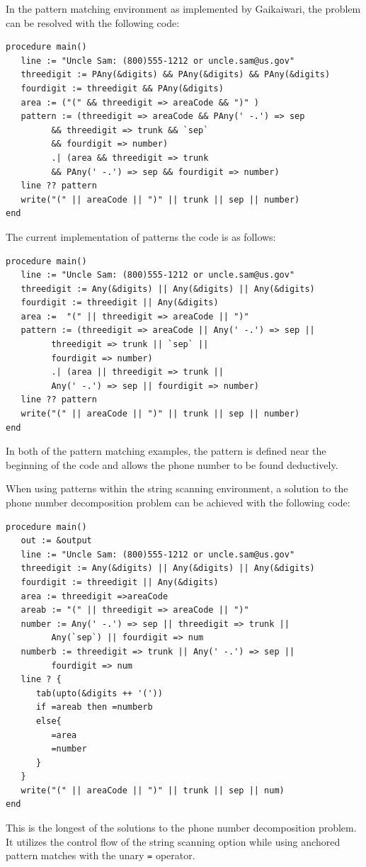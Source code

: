\documentclass{article}
\begin{document}
In the pattern matching environment as implemented by Gaikaiwari, the problem can be resolved with the following code:
\begin{verbatim}
procedure main()
   line := "Uncle Sam: (800)555-1212 or uncle.sam@us.gov"
   threedigit := PAny(&digits) && PAny(&digits) && PAny(&digits)
   fourdigit := threedigit && PAny(&digits)
   area := ("(" && threedigit => areaCode && ")" )
   pattern := (threedigit => areaCode && PAny(' -.') => sep
         && threedigit => trunk && `sep`
         && fourdigit => number)
         .| (area && threedigit => trunk
         && PAny(' -.') => sep && fourdigit => number)
   line ?? pattern
   write("(" || areaCode || ")" || trunk || sep || number) 
end
\end{verbatim}

The current implementation of patterns the code is as follows:
\begin{verbatim}
procedure main()
   line := "Uncle Sam: (800)555-1212 or uncle.sam@us.gov"
   threedigit := Any(&digits) || Any(&digits) || Any(&digits)
   fourdigit := threedigit || Any(&digits)
   area :=  "(" || threedigit => areaCode || ")" 
   pattern := (threedigit => areaCode || Any(' -.') => sep || 
         threedigit => trunk || `sep` || 
         fourdigit => number) 
         .| (area || threedigit => trunk || 
         Any(' -.') => sep || fourdigit => number)
   line ?? pattern
   write("(" || areaCode || ")" || trunk || sep || number) 
end
\end{verbatim}
In both of the pattern matching examples, the pattern is defined near the beginning of the code and allows the phone number to be found deductively. 

When using patterns within the string scanning environment, a solution to the phone number decomposition problem can be achieved with the following code:
\begin{verbatim}
procedure main()
   out := &output
   line := "Uncle Sam: (800)555-1212 or uncle.sam@us.gov"
   threedigit := Any(&digits) || Any(&digits) || Any(&digits)
   fourdigit := threedigit || Any(&digits)
   area := threedigit =>areaCode
   areab := "(" || threedigit => areaCode || ")"
   number := Any(' -.') => sep || threedigit => trunk || 
         Any(`sep`) || fourdigit => num
   numberb := threedigit => trunk || Any(' -.') => sep || 
         fourdigit => num
   line ? {
      tab(upto(&digits ++ '('))
      if =areab then =numberb
      else{
         =area
         =number
      }
   }
   write("(" || areaCode || ")" || trunk || sep || num) 
end
\end{verbatim}
This is the longest of the solutions to the phone number decomposition problem.  It utilizes the control flow of the string scanning option while using anchored pattern matches with the unary \texttt{=} operator.
\end{document}
